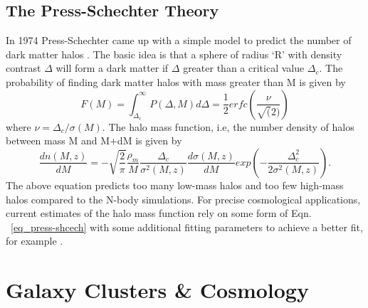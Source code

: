 \subsection{The Press-Schechter Theory}
\label{halo-theory}
In 1974 Press-Schechter came up with a simple model to predict the number of dark matter halos \citep{press74}. The basic idea is that a sphere of radius `R' with density contrast $\Delta$ will form a dark matter if $\Delta$ greater than a critical value $\Delta_{c}$. The probability of finding dark matter halos with mass greater than M is given by
\begin{equation}
F(M) = \int^{\infty}_{\Delta_{c}} P(\Delta, M) d\Delta = \frac{1}{2} erfc(\frac{\nu}{\sqrt(2)})
\end{equation}
where $\nu = \Delta_{c}/ \sigma(M)$. The halo mass function, i.e, the number density of halos between mass M and M+dM is given by 
\begin{equation}
\frac{dn(M,z)}{dM} = -\sqrt{\frac{2}{\pi}} \frac{\rho_{m}}{M} \frac{\Delta_{c}}{\sigma^{2}(M,z)} \frac{d\sigma(M,z)}{dM}  exp(-\frac{\Delta^{2}_{c}}{2 \sigma^{2}(M,z)}).
\label{eq_press-shcech}
\end{equation}
The above equation predicts too many low-mass halos and too few high-mass halos compared to the N-body simulations. 
For precise cosmological applications, current estimates of the halo mass function rely on some form of Eqn. ~\ref{eq_press-shcech} with some additional fitting parameters to achieve a better fit, for example \cite{tinker08, jenkins01}.

\section{Galaxy Clusters \& Cosmology}
